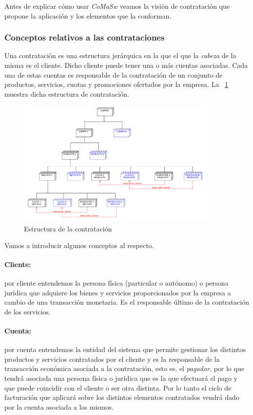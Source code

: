 Antes de explicar cómo usar \emph{CoMaSw} veamos la visión de contratación que propone la aplicación y los elementos que la conforman.



\subsubsection{Conceptos relativos a las contrataciones}
\label{sub:contratacion-conceptos}

Una contratación es una estructura jerárquica en la que el que la \textit{cabeza} de la misma es el cliente. Dicho cliente puede tener una o más cuentas asociadas. Cada una de estas cuentas es responsable de la contratación de un conjunto de productos, servicios, cuotas y promociones ofertados por la empresa. La \figurename~\ref{fig:estructura-contratacion} muestra dicha estructura de contratación.

\begin{figure}[H]
  \centering
  \includegraphics[width=0.9\textwidth]{imaxes/estructura-contratacion.png}
  \caption{Estructura de la contratación}
  \label{fig:estructura-contratacion}
\end{figure}


Vamos a introducir algunos conceptos al respecto.

\paragraph{Cliente:} por cliente entendemos la persona física (particular o autónomo) o persona jurídica que adquiere los bienes y servicios proporcionados por la empresa a cambio de una transacción monetaria. Es el responsable último de la contratación de los servicios.

\paragraph{Cuenta:} por cuenta entendemos la entidad del sistema que permite gestionar los distintos productos y servicios contratados por el cliente y es la responsable de la transacción económica asociada a la contratación, esto es, el \textit{pagador}, por lo que tendrá asociada una persona física o jurídica que es la que efectuará el pago y que puede coincidir con el cliente o ser otra distinta. Por lo tanto el ciclo de facturación que aplicará sobre los distintos elementos contratados vendrá dado por la cuenta asociada a los mismos.

